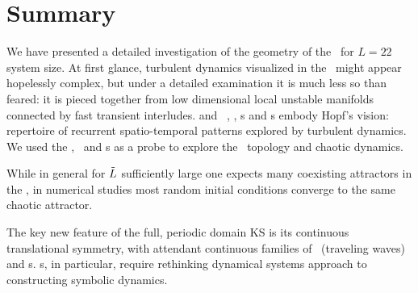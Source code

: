 
\section{Summary}
\label{sect:rpo-sum}


We have presented a detailed investigation
of the geometry of the
{\KS} \statesp\ for $L=22$ system size.
At first glance, turbulent dynamics visualized in the \statesp\ might appear
hopelessly complex, but under a detailed examination it is
much less so than feared: it is
pieced together from low dimensional %
local unstable manifolds connected by fast transient interludes.
{\KS} and \pCf\  \eqv, \reqv, \po s and 
\rpo s embody Hopf's vision:
repertoire of recurrent spatio-temporal
patterns explored by turbulent dynamics.
We used
the \eqva, \reqva\ and {\rpo}s as a probe to explore the
\statesp\  topology and chaotic dynamics.

While in general
for $\tilde{L}$ sufficiently large
one expects many 
coexisting attractors in the \statesp%
,
in numerical studies most random initial
conditions converge to the same chaotic attractor. 

The key new feature of the full, periodic domain
KS is its continuous translational symmetry,
with attendant continuous families of
\reqva\ (traveling waves) and \rpo s.
\Rpo s, in particular, require rethinking dynamical systems
approach to constructing symbolic dynamics. 







